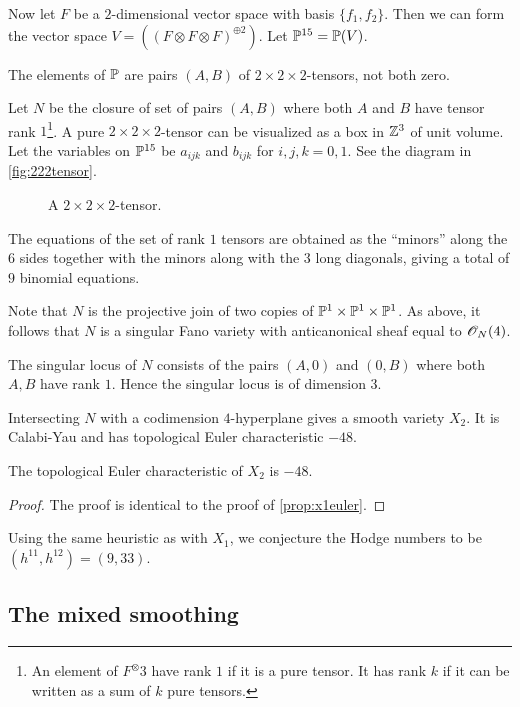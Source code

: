 Now let $F$ be a $2$-dimensional vector space with basis $\{f_1,f_2\}$. Then we can form the vector space $V = ((F \otimes F \otimes F)^{\oplus 2})$. Let $\P^{15}=\P(V)$.

The elements of $\P$ are pairs $(A,B)$ of $2 \times 2 \times 2$-tensors, not both zero. 

Let $N$ be the closure of set of pairs $(A,B)$ where both $A$ and $B$ have tensor rank $1$\footnote{An element of $F^\otimes 3$ have rank $1$ if it is a pure tensor. It has rank $k$ if it can be written as a sum of $k$ pure tensors.}. A pure $2 \times 2 \times 2$-tensor can be visualized as a box in $\Z^3$ of unit volume. Let the variables on $\P^{15}$ be $a_{ijk}$ and $b_{ijk}$ for $i,j,k=0,1$. See the diagram in \vref{fig:222tensor}.

\begin{figure}[t]
\centering

\caption{A $2 \times 2 \times 2$-tensor.}
\label{fig:222tensor}
\end{figure}

The equations of the set of rank $1$ tensors are obtained as the ``minors'' along the $6$ sides together with the minors along with the $3$ long diagonals, giving a total of $9$ binomial equations. 

Note that $N$ is the projective join of two copies of $\P^1 \times \P^1 \times \P^1$. As above, it follows that $N$ is a singular Fano variety with anticanonical sheaf equal to $\OO_N(4)$. 

The singular locus of $N$ consists of the pairs $(A,0)$ and $(0,B)$ where both $A,B$ have rank $1$. Hence the singular locus is of dimension $3$.

Intersecting $N$ with a codimension $4$-hyperplane gives a smooth variety $X_2$. It is Calabi-Yau and has topological Euler characteristic $-48$.

\begin{proposition}
The topological Euler characteristic of $X_2$ is $-48$.
\end{proposition}
\begin{proof}
The proof is identical to the proof of \cref{prop:x1euler}.
\end{proof}

\begin{remark}
Using the same heuristic as with $X_1$, we conjecture the Hodge numbers to be $(h^{11},h^{12})=(9,33)$. 
\end{remark}

\subsection{The mixed smoothing}

